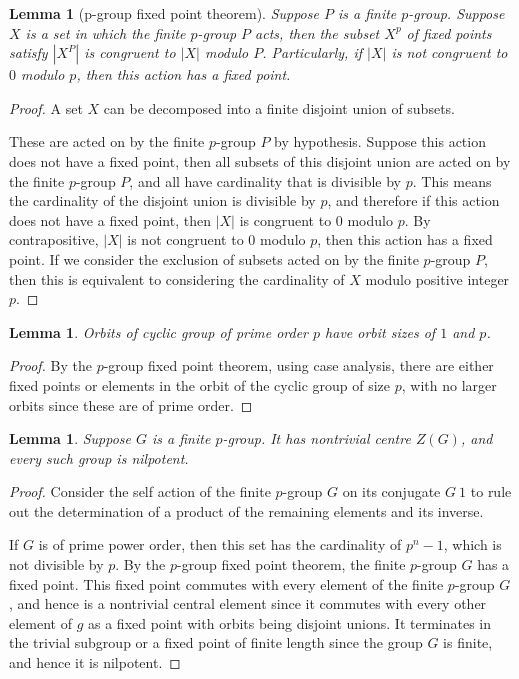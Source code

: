 \documentclass{tufte-book}
\newtheorem{lemma}[theorem]{Lemma}
\begin{document}
\begin{lemma}[p-group fixed point theorem]
  Suppose $P$ is a finite $p$-group.
  Suppose $X$ is a set in which the finite $p$-group $P$ acts, then the subset $X^{p}$ of fixed points satisfy $|X^P|$ is congruent to $|X|$ modulo $P$. Particularly, if $|X|$ is not congruent to $0$ modulo $p$, then this action has a fixed point. 
\end{lemma}

\begin{proof}
  A set $X$ can be decomposed into a finite disjoint union of subsets.

  These are acted on by the finite $p$-group $P$ by hypothesis. Suppose this action does not have a fixed point, then all subsets of this disjoint union are acted on by the finite $p$-group $P$, and all have cardinality that is divisible by $p$. This means the cardinality of the disjoint union is divisible by $p$, and therefore if this action does not have a fixed point, then $|X|$ is congruent to $0$ modulo $p$. By contrapositive, $|X|$ is not congruent to $0$ modulo $p$, then this action has a fixed point.
  If we consider the exclusion of subsets acted on by the finite $p$-group $P$, then this is equivalent to considering the cardinality of $X$ modulo positive integer $p$.
\end{proof}

\begin{lemma}
  Orbits of cyclic group of prime order $p$ have orbit sizes of $1$ and $p$.
\end{lemma}

\begin{proof}
  By the $p$-group fixed point theorem, using case analysis, there are either fixed points or elements in the orbit of the cyclic group of size $p$, with no larger orbits since these are of prime order.
\end{proof}

\begin{lemma}
  Suppose $G$ is a finite $p$-group. It has nontrivial centre $Z(G)$, and every such group is nilpotent.
\end{lemma}

\begin{proof}
  Consider the self action of the finite $p$-group $G$ on its conjugate $G \ {1}$ to rule out the determination of a product of the remaining elements and its inverse.

  If $G$ is of prime power order, then this set has the cardinality of $p^n - 1$, which is not divisible by $p$. By the $p$-group fixed point theorem, the finite $p$-group $G$ has a fixed point. This fixed point commutes with every element of the finite $p$-group $G$, and hence is a nontrivial central element since it commutes with every other element of $g$ as a fixed point with orbits being disjoint unions. It terminates in the trivial subgroup or a fixed point of finite length since the group $G$ is finite, and hence it is nilpotent.
\end{proof}
\end{document}
